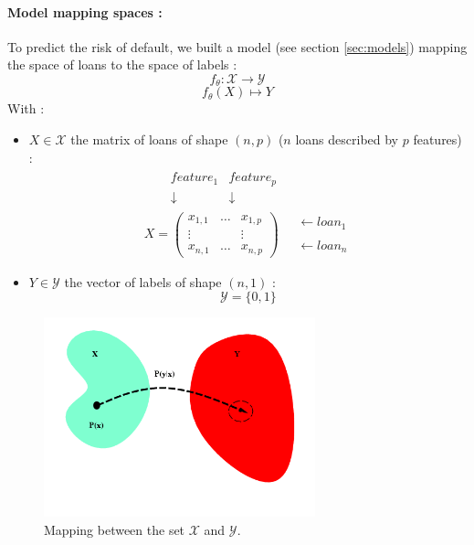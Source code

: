 \paragraph{Model mapping spaces :}
	To predict the risk of default, we built a model (see section \ref{sec:models}) mapping the space of loans to the space of labels : $$f_\theta:\mathcal{X}\rightarrow \mathcal{Y}$$
	$$f_\theta(X)\mapsto Y$$
	With :
	\begin{itemize}[label=$\bullet$]
		\item $X\in\mathcal{X}$ the matrix of loans of shape $(n,p)$ ($n$ loans described by $p$ features) :
		$$
		\begin{array}{cc}
			\begin{array}{ccc}
				 & ~~~~feature_1 & feature_p\\
				 & ~~~~\downarrow & \downarrow
			\end{array}\\
				X =
			\left(
				\begin{array}{ccc}
					x_{1,1} & \dots & x_{1,p}\\
					\vdots &  & \vdots\\
					x_{n,1} & \dots & x_{n,p}
				\end{array}
			\right) & \begin{array}{c}
		  \leftarrow loan_1\\
		  \\
		  \leftarrow loan_n
		  \end{array}
		  \end{array}$$
		\item $Y\in\mathcal{Y}$ the vector of labels of shape $(n,1)$ : $$\mathcal{Y} = \{0, 1\}$$
	\end{itemize}

	\begin{figure}[h]
		\centering
		\includegraphics[width=0.7\textwidth]{images/mapping_proba.png}
		\caption{Mapping between the set $\mathcal{X}$ and $\mathcal{Y}$.}
		\label{fig:mapping_proba}
	\end{figure}

